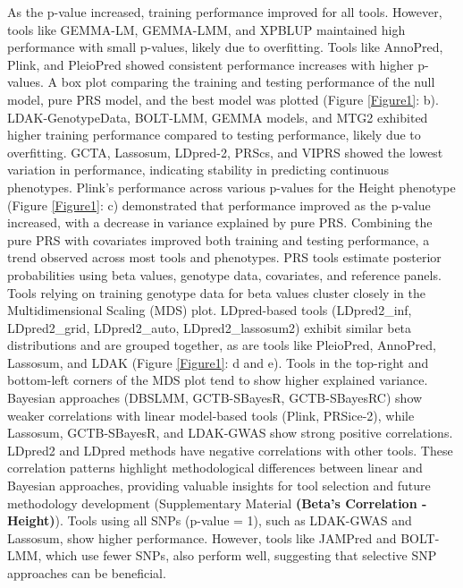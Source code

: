 \documentclass[pdflatex,sn-basic]{sn-jnl}
\begin{document}
As the p-value increased, training performance improved for all tools. However, tools like GEMMA-LM, GEMMA-LMM, and XPBLUP maintained high performance with small p-values, likely due to overfitting. Tools like AnnoPred, Plink, and PleioPred showed consistent performance increases with higher p-values. A box plot comparing the training and testing performance of the null model, pure PRS model, and the best model was plotted (Figure \ref{Figure1}: b). LDAK-GenotypeData, BOLT-LMM, GEMMA models, and MTG2 exhibited higher training performance compared to testing performance, likely due to overfitting. GCTA, Lassosum, LDpred-2, PRScs, and VIPRS showed the lowest variation in performance, indicating stability in predicting continuous phenotypes. Plink’s performance across various p-values for the Height phenotype (Figure \ref{Figure1}: c) demonstrated that performance improved as the p-value increased, with a decrease in variance explained by pure PRS. Combining the pure PRS with covariates improved both training and testing performance, a trend observed across most tools and phenotypes. PRS tools estimate posterior probabilities using beta values, genotype data, covariates, and reference panels. Tools relying on training genotype data for beta values cluster closely in the Multidimensional Scaling (MDS) plot. LDpred-based tools (LDpred2\_inf, LDpred2\_grid, LDpred2\_auto, LDpred2\_lassosum2) exhibit similar beta distributions and are grouped together, as are tools like PleioPred, AnnoPred, Lassosum, and LDAK (Figure \ref{Figure1}: d and e). Tools in the top-right and bottom-left corners of the MDS plot tend to show higher explained variance. Bayesian approaches (DBSLMM, GCTB-SBayesR, GCTB-SBayesRC) show weaker correlations with linear model-based tools (Plink, PRSice-2), while Lassosum, GCTB-SBayesR, and LDAK-GWAS show strong positive correlations. LDpred2 and LDpred methods have negative correlations with other tools. These correlation patterns highlight methodological differences between linear and Bayesian approaches, providing valuable insights for tool selection and future methodology development (Supplementary Material \textbf{(Beta's Correlation - Height)}). Tools using all SNPs (p-value = 1), such as LDAK-GWAS and Lassosum, show higher performance. However, tools like JAMPred and BOLT-LMM, which use fewer SNPs, also perform well, suggesting that selective SNP approaches can be beneficial. 
\end{document}
